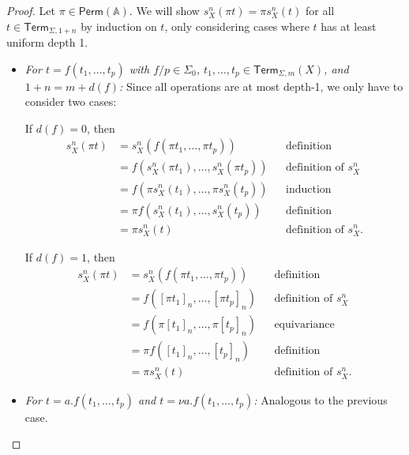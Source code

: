 \documentclass[11pt,a4paper]{amsart}
\newcommand{\Perm}{\mathsf{Perm}(\Names)}
\newcommand{\Term}{\mathsf{Term}}
\newcommand{\sig}{\Sigma}
\newcommand{\sigp}{\Sigma_0}
\newcommand{\Names}{\mathbb{A}}
\theoremstyle{plain}
\numberwithin{equation}{section}
\newcommand{\+}[1]{\mathcal{#1}\xspace}
\theoremstyle{definition}
\begin{document}
\begin{proof}
    Let \(\pi \in \Perm\). We will show \(s^n_X(\pi t) = \pi s^n_X(t)\) for all \(t \in \Term_{\sig, 1 + n}\) by induction on \(t\), only considering cases where \(t\) has at least uniform depth 1.
    \begin{itemize}
        \item
            \textit{For \(t = f(t_1, \ldots, t_p)\) with \(f/p \in \sigp\), \(t_1, \ldots, t_p \in \Term_{\sig, m}(X)\), and \(1 + n = m + d(f)\):}
            Since all operations are at most depth-1, we only have to consider two cases:

            If \(d(f) = 0\), then
            \begin{align*}
                s^n_X(\pi t)
                &= s^n_X(f(\pi t_1, \ldots, \pi t_p)) && \text{definition} \\
                &= f(s^n_X(\pi t_1), \ldots, s^n_X(\pi t_p)) && \text{definition of } s^n_X \\
                &= f(\pi s^n_X(t_1), \ldots, \pi s^n_X(t_p)) && \text{induction} \\
                &= \pi f(s^n_X(t_1), \ldots, s^n_X(t_p)) && \text{definition} \\
                &= \pi s^n_X(t) && \text{definition of } s^n_X.
            \end{align*}

            If \(d(f) = 1\), then
            \begin{align*}
                s^n_X(\pi t)
                &= s^n_X(f(\pi t_1, \ldots, \pi t_p)) && \text{definition} \\
                &= f([\pi t_1]_n, \ldots, [\pi t_p]_n) && \text{definition of } s^n_X \\
                &= f(\pi[t_1]_n, \ldots, \pi[t_p]_n) && \text{equivariance} \\
                &= \pi f([t_1]_n, \ldots, [t_p]_n) && \text{definition} \\
                &= \pi s^n_X(t) && \text{definition of } s^n_X.
            \end{align*}
        \item
            \textit{For \(t = a.f(t_1, \ldots, t_p)\) and \(t = \nu a.f(t_1, \ldots, t_p)\):}
            Analogous to the previous case.
    \end{itemize}

\end{proof}
\end{document}
